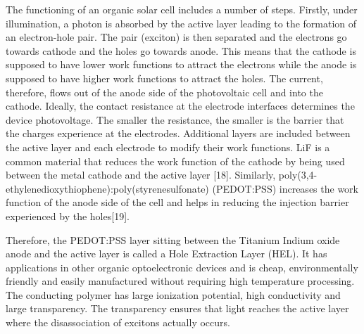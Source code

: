 \documentclass[]{article}
\begin{document}
The functioning of an organic solar cell includes a number of steps. Firstly, under illumination, a photon is absorbed by the active layer leading to the formation of an electron-hole pair. The pair (exciton) is then separated and the electrons go towards cathode and the holes go towards anode. This means that the cathode is supposed to have lower work functions to attract the electrons while the anode is supposed to have higher work functions to attract the holes. The current, therefore, flows out of the anode side of the photovoltaic cell and into the cathode. Ideally, the contact resistance at the electrode interfaces determines the device photovoltage. The smaller the resistance, the smaller is the barrier that the charges experience at the electrodes. Additional layers are included between the active layer and each electrode to modify their work functions. LiF is a common material that reduces the work function of the cathode by being used between the metal cathode and the active layer {[}18{]}. Similarly, poly(3,4-ethylenedioxythiophene):poly(styrenesulfonate) (PEDOT:PSS) increases the work function of the anode side of the cell and helps in reducing the injection barrier experienced by the holes{[}19{]}.

Therefore, the PEDOT:PSS layer sitting between the Titanium Indium oxide anode and the active layer is called a Hole Extraction Layer (HEL). It has applications in other organic optoelectronic devices and is cheap, environmentally friendly and easily manufactured without requiring high temperature processing. The conducting polymer has large ionization potential, high conductivity and large transparency. The transparency ensures that light reaches the active layer where the disassociation of excitons actually occurs.
\end{document}
